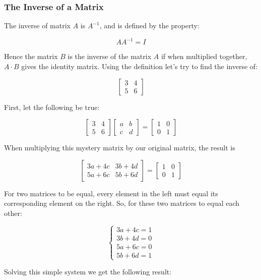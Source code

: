 \documentclass[11pt]{article}
\begin{document}
    \hypertarget{the-inverse-of-a-matrix}{%
\subsubsection{The Inverse of a Matrix}\label{the-inverse-of-a-matrix}}

The inverse of matrix \(A\) is \(A^{-1}\), and is defined by the
property:

\[ AA^{-1}=I \]

Hence the matrix \(B\) is the inverse of the matrix \(A\) if when
multiplied together, \(A\cdot B\) gives the identity matrix. Using the
definition let's try to find the inverse of:

\[
\begin{bmatrix}
3 & 4\\
5 & 6
\end{bmatrix}
\]

First, let the following be true:

\[
\begin{bmatrix}
3 & 4\\
5 & 6
\end{bmatrix}
\begin{bmatrix}
a & b\\
c & d
\end{bmatrix}
=
\begin{bmatrix}
1 & 0\\
0 & 1
\end{bmatrix}
\]

When multiplying this mystery matrix by our original matrix, the result
is

\[
\begin{bmatrix}
3a+4c & 3b+4d\\
5a+6c & 5b+6d
\end{bmatrix}
=
\begin{bmatrix}
1 & 0\\
0 & 1
\end{bmatrix}
\]

For two matrices to be equal, every element in the left must equal its
corresponding element on the right. So, for these two matrices to equal
each other:

\[
\begin{cases}
3a+4c=1\\
3b+4d=0\\
5a+6c=0\\
5b+6d=1
\end{cases}
\]

Solving this simple system we get the following result:
\end{document}
